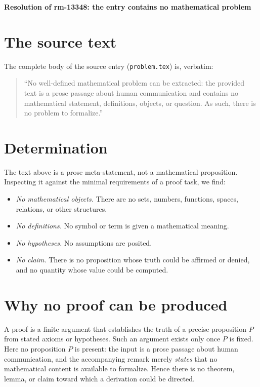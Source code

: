 \documentclass{amsart}
\begin{document}
\begin{center}
\textbf{Resolution of rm-13348: the entry contains no mathematical problem}
\end{center}

\section*{The source text}

The complete body of the source entry (\texttt{problem.tex}) is, verbatim:

\begin{quote}
``No well-defined mathematical problem can be extracted: the provided text
is a prose passage about human communication and contains no mathematical
statement, definitions, objects, or question. As such, there is no problem
to formalize.''
\end{quote}

\section*{Determination}

The text above is a prose meta-statement, not a mathematical proposition.
Inspecting it against the minimal requirements of a proof task, we find:
\begin{itemize}
  \item \emph{No mathematical objects.} There are no sets, numbers,
        functions, spaces, relations, or other structures.
  \item \emph{No definitions.} No symbol or term is given a mathematical
        meaning.
  \item \emph{No hypotheses.} No assumptions are posited.
  \item \emph{No claim.} There is no proposition whose truth could be
        affirmed or denied, and no quantity whose value could be computed.
\end{itemize}

\section*{Why no proof can be produced}

A proof is a finite argument that establishes the truth of a precise
proposition $P$ from stated axioms or hypotheses. Such an argument exists
only once $P$ is fixed. Here no proposition $P$ is present: the input is a
prose passage about human communication, and the accompanying remark merely
\emph{states} that no mathematical content is available to formalize. Hence
there is no theorem, lemma, or claim toward which a derivation could be
directed.
\end{document}
